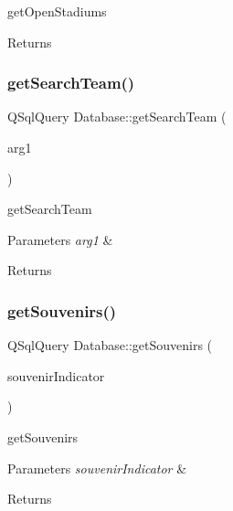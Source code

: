 get\+Open\+Stadiums 

\begin{DoxyReturn}{Returns}

\end{DoxyReturn}
\mbox{\label{class_database_a8181dd6904b67c1c6db97fc696583d65}} 
\subsubsection{\texorpdfstring{get\+Search\+Team()}{getSearchTeam()}}
{\footnotesize\ttfamily Q\+Sql\+Query Database\+::get\+Search\+Team (\begin{DoxyParamCaption}\item[{const Q\+String \&}]{arg1 }\end{DoxyParamCaption})}



get\+Search\+Team 


\begin{DoxyParams}{Parameters}
{\em arg1} & \\
\hline
\end{DoxyParams}
\begin{DoxyReturn}{Returns}

\end{DoxyReturn}
\mbox{\label{class_database_adc23956b138dca3e4d0b22354dfb3a6e}} 
\subsubsection{\texorpdfstring{get\+Souvenirs()}{getSouvenirs()}}
{\footnotesize\ttfamily Q\+Sql\+Query Database\+::get\+Souvenirs (\begin{DoxyParamCaption}\item[{Q\+String}]{souvenir\+Indicator }\end{DoxyParamCaption})}



get\+Souvenirs 


\begin{DoxyParams}{Parameters}
{\em souvenir\+Indicator} & \\
\hline
\end{DoxyParams}
\begin{DoxyReturn}{Returns}

\end{DoxyReturn}
\mbox{\label{class_database_acb70cac23e455f88da5d697a2adb5ae6}} 
